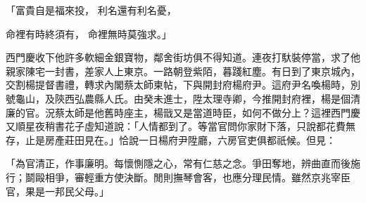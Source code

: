 \begin{showcontents}{}
「富貴自是福來投，  利名還有利名憂，

命裡有時終須有，  命裡無時莫強求。」

西門慶收下他許多軟細金銀寶物，鄰舍街坊俱不得知道。連夜打馱裝停當，求了他親家陳宅一封書，差家人上東京。一路朝登紫陌，暮踐紅塵。有日到了東京城內，交割楊提督書禮，轉求內閣蔡太師柬帖，下與開封府楊府尹。這府尹名喚楊時，別號龜山，及陝西弘農縣人氏。由癸未進士，陞太理寺卿，今推開封府裡，楊是個清廉的官。況蔡太師是他舊時座主，楊戩又是當道時臣，如何不做分上？這裡西門慶又順星夜稍書花子虛知道說：「人情都到了。等當官問你家財下落，只說都花費無存，止是房產莊田見在。」恰說一日楊府尹陞廳，六房官吏俱都祇候。但見：

「為官清正，作事廉明。每懷惻隱之心，常有仁慈之念。爭田奪地，辨曲直而後施行；鬬毆相爭，審輕重方使決斷。閒則撫琴會客，也應分理民情。雖然京兆宰臣官，果是一邦民父母。」


\end{showcontents}
